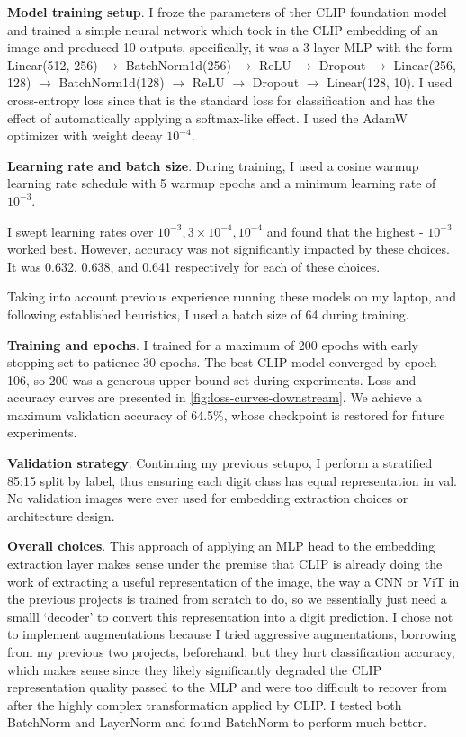 \documentclass[11pt]{article}
\begin{document}
\textbf{Model training setup}. I froze the parameters of ther CLIP foundation model and trained a simple neural network which took in the CLIP embedding of an image and produced 10 outputs, specifically, it was a 3-layer MLP with the form  
Linear(512, 256) $\to$ BatchNorm1d(256) $\to$ ReLU $\to$ Dropout $\to$ Linear(256, 128) $\to$ BatchNorm1d(128) $\to$ ReLU $\to$ Dropout $\to$ Linear(128, 10). I used cross-entropy loss since that is the standard loss for classification and has the effect of automatically applying a softmax-like effect. I used the AdamW optimizer with weight decay $10^{-4}$.

\textbf{Learning rate and batch size}. During training, I used a cosine warmup learning rate schedule with 5 warmup epochs and a minimum learning rate of $10^{-3}$. 

I swept learning rates over $10^{-3}, 3 \times 10^{-4}, 10^{-4}$ and found that the highest - $10^{-3}$ worked best. However, accuracy was not significantly impacted by these choices. It was 0.632, 0.638, and 0.641 respectively for each of these choices. 

Taking into account previous experience running these models on my laptop, and following established heuristics, I used a batch size of 64 during training. 

\textbf{Training and epochs}. I trained for a maximum of 200 epochs with early stopping set to patience 30 epochs. The best CLIP model converged by epoch 106, so 200 was a generous upper bound set during experiments. Loss and accuracy curves are presented in \autoref{fig:loss-curves-downstream}. We achieve a maximum validation accuracy of 64.5\%, whose checkpoint is restored for future experiments. 

\textbf{Validation strategy}. Continuing my previous setupo, I perform a stratified 85:15 split by label, thus ensuring each digit class has equal representation in val. No validation images were ever used for embedding extraction choices or architecture design.

\textbf{Overall choices}. This approach of applying an MLP head to the embedding extraction layer makes sense under the premise that CLIP is already doing the work of extracting a useful representation of the image, the way a CNN or ViT in the previous projects is trained from scratch to do, so we essentially just need a smalll `decoder' to convert this representation into a digit prediction. I chose not to implement augmentations because I tried aggressive augmentations, borrowing from my previous two projects, beforehand, but they hurt classification accuracy, which makes sense since they likely significantly degraded the CLIP representation quality passed to the MLP and were too difficult to recover from after the highly complex transformation applied by CLIP. I tested both BatchNorm and LayerNorm and found BatchNorm to perform much better. 
\end{document}
